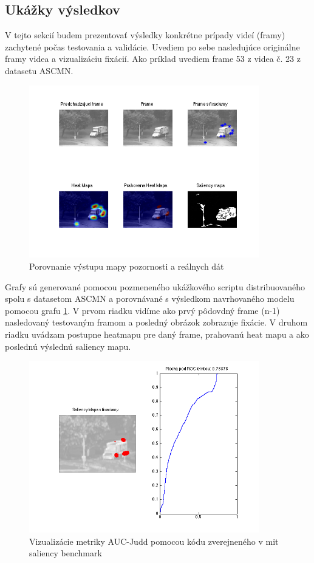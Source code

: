 \subsection{Ukážky výsledkov}
V tejto sekcií budem prezentovať výsledky konkrétne prípady videí (framy) zachytené počas testovania a validácie.
Uvediem po sebe nasledujúce originálne framy videa a vizualizáciu fixácií. Ako príklad uvediem frame 53 z videa č. 23 z datasetu ASCMN\cite{accv}.
\begin{figure}[H]
  \centering
  \includegraphics[width=10cm]{pics/ACCV-23-54-compare.png}
  \caption{Porovnanie výstupu mapy pozornosti a reálnych dát}
  \label{fig:ASCMN-53-23}
  \vspace{10mm}
\end{figure}
Grafy sú generované pomocou pozmeneného ukážkového scriptu distribuovaného spolu s datasetom ASCMN\cite{accv} a porovnávané s výsledkom navrhovaného modelu pomocou grafu \ref{fig:ASCMN-53-23}.
V prvom riadku vidíme ako prvý pôdovdný frame (n-1) nasledovaný testovaným framom a posledný obrázok zobrazuje fixácie.
V druhom riadku uvádzam postupne heatmapu pre daný frame, prahovanú heat mapu a ako poslednú výslednú saliency mapu.

\begin{figure}[H]
  \centering
  \includegraphics[width=10cm]{pics/ACCV-23-54-AUC_Judd.png}
  \caption{Vizualizácie metriky AUC-Judd pomocou kódu zverejneného v mit saliency benchmark\cite{mit-saliency-benchmark}}
  \label{fig:ASCMN-53-23-AUC}
  \vspace{10mm}
\end{figure}

